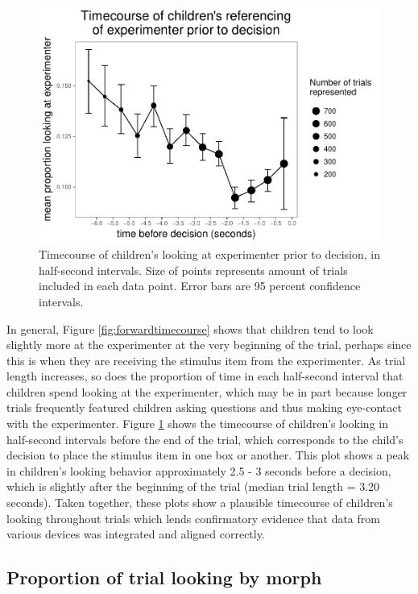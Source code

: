\documentclass[floatsintext,man]{apa6}
\theoremstyle{definition}
\theoremstyle{definition}
\theoremstyle{definition}
\theoremstyle{remark}
\begin{document}
\begin{figure}
\centering
\includegraphics{soc_ref_category_paper_files/figure-latex/reversetimecourse-1.pdf}
\caption{\label{fig:reversetimecourse}Timecourse of children's looking at
experimenter prior to decision, in half-second intervals. Size of points
represents amount of trials included in each data point. Error bars are
95 percent confidence intervals.}
\end{figure}

In general, Figure \ref{fig:forwardtimecourse} shows that children tend
to look slightly more at the experimenter at the very beginning of the
trial, perhaps since this is when they are receiving the stimulus item
from the experimenter. As trial length increases, so does the proportion
of time in each half-second interval that children spend looking at the
experimenter, which may be in part because longer trials frequently
featured children asking questions and thus making eye-contact with the
experimenter. Figure \ref{fig:reversetimecourse} shows the timecourse of
children's looking in half-second intervals before the end of the trial,
which corresponds to the child's decision to place the stimulus item in
one box or another. This plot shows a peak in children's looking
behavior approximately 2.5 - 3 seconds before a decision, which is
slightly after the beginning of the trial (median trial length = 3.20
seconds). Taken together, these plots show a plausible timecourse of
children's looking throughout trials which lends confirmatory evidence
that data from various devices was integrated and aligned correctly.

\subsection{Proportion of trial looking by
morph}\label{proportion-of-trial-looking-by-morph}
\end{document}
